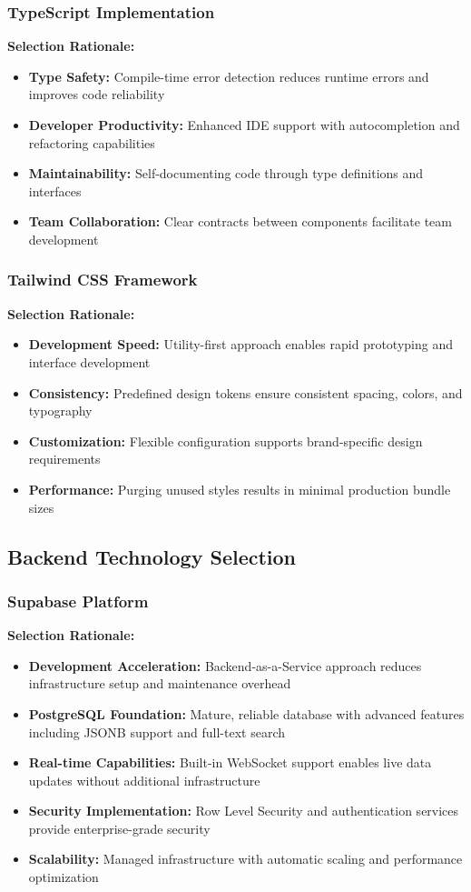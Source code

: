 \subsubsection{TypeScript Implementation}
\textbf{Selection Rationale:}
\begin{itemize}
\item \textbf{Type Safety:} Compile-time error detection reduces runtime errors and improves code reliability
\item \textbf{Developer Productivity:} Enhanced IDE support with autocompletion and refactoring capabilities
\item \textbf{Maintainability:} Self-documenting code through type definitions and interfaces
\item \textbf{Team Collaboration:} Clear contracts between components facilitate team development
\end{itemize}

\subsubsection{Tailwind CSS Framework}
\textbf{Selection Rationale:}
\begin{itemize}
\item \textbf{Development Speed:} Utility-first approach enables rapid prototyping and interface development
\item \textbf{Consistency:} Predefined design tokens ensure consistent spacing, colors, and typography
\item \textbf{Customization:} Flexible configuration supports brand-specific design requirements
\item \textbf{Performance:} Purging unused styles results in minimal production bundle sizes
\end{itemize}

\subsection{Backend Technology Selection}

\subsubsection{Supabase Platform}
\textbf{Selection Rationale:}
\begin{itemize}
\item \textbf{Development Acceleration:} Backend-as-a-Service approach reduces infrastructure setup and maintenance overhead
\item \textbf{PostgreSQL Foundation:} Mature, reliable database with advanced features including JSONB support and full-text search
\item \textbf{Real-time Capabilities:} Built-in WebSocket support enables live data updates without additional infrastructure
\item \textbf{Security Implementation:} Row Level Security and authentication services provide enterprise-grade security
\item \textbf{Scalability:} Managed infrastructure with automatic scaling and performance optimization
\end{itemize}

